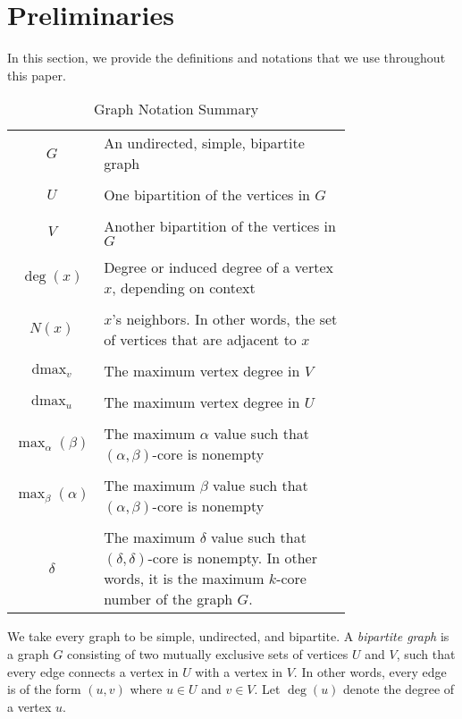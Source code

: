 \section{Preliminaries}
In this section, we provide the definitions and notations that we use throughout this paper.


\begin{table}[t]
\caption{\label{tab:notation}Graph Notation Summary}
 \begin{tabular}{|| c p{0.75\linewidth} ||} 
 \hline
 $G$ & An undirected, simple, bipartite graph \\ & \\
 $U$ & One bipartition of the vertices in $G$ \\ & \\
 $V$ & Another bipartition of the vertices in $G$ \\ & \\
 $\deg(x)$ & Degree or induced degree of a vertex $x$, depending on context \\ & \\
 $N(x)$ & $x$'s neighbors. In other words, the set of vertices that are adjacent to $x$ \\ & \\
 $\text{dmax}_v$ & The maximum vertex degree in $V$ \\ & \\
 $\text{dmax}_u$ & The maximum vertex degree in $U$ \\ & \\
 $\max_\alpha(\beta)$ & The maximum $\alpha$ value such that $(\alpha,\beta)$-core is nonempty \\ & \\
 $\max_\beta(\alpha)$ & The maximum $\beta$ value such that
 $(\alpha,\beta)$-core is nonempty \\ & \\
 $\delta$ & The maximum $\delta$ value such that $(\delta,\delta)$-core is nonempty. In other words, it is the maximum $k$-core number of the graph $G$. \\
 \hline 
\end{tabular}
\end{table}


We take every graph to be simple, undirected, and bipartite.
A \emph{bipartite graph} is a graph $G$ consisting of two mutually exclusive sets of vertices $U$ and $V$, such that every edge connects a vertex in $U$ with a vertex in $V$. In other words, every edge is of the form $(u,v)$ where $u\in U$ and $v\in V$.
Let $\deg(u)$ denote the degree of a vertex $u$. 

